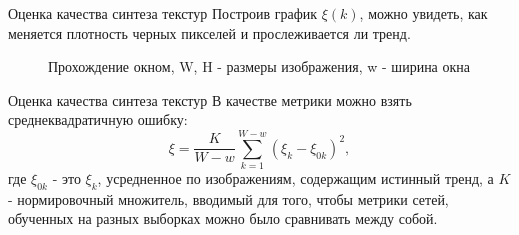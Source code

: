 \documentclass[12pt]{beamer}
\begin{document}
	\begin{frame}{Оценка качества синтеза текстур}
		Построив график $\xi(k)$, можно увидеть, как меняется плотность черных пикселей и прослеживается ли тренд.
		
		\begin{figure}[h!]
			\vfill
			Прохождение окном, W, H - размеры изображения, w - ширина окна
		\end{figure}
	\end{frame}
	
	\begin{frame}{Оценка качества синтеза текстур}
		В качестве метрики можно взять среднеквадратичную ошибку:
		$$ \xi = \frac{K}{W-w}\sum_{k=1}^{W-w} (\xi_k - \xi_{0k})^2,$$
		где $\xi_{0k}$ - это $\xi_k$, усредненное по изображениям, содержащим истинный тренд, а $K$ - нормировочный множитель, вводимый для того, чтобы метрики сетей, обученных на разных выборках можно было сравнивать между собой.
	\end{frame}
	
\end{document}
